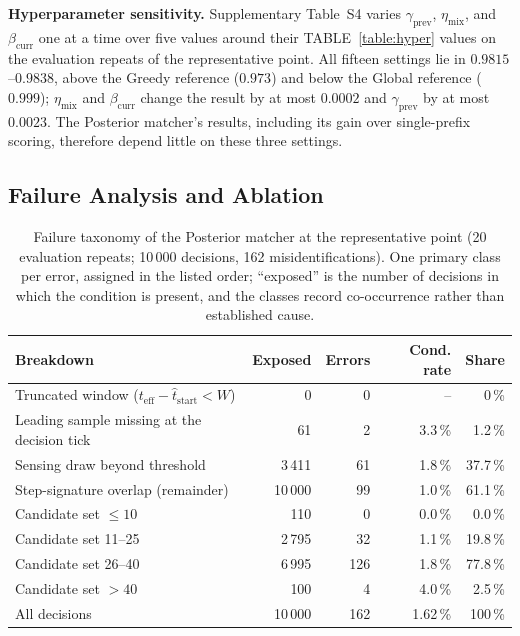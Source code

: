 \documentclass{ieeeaccess}
\newif\ifhighlight \highlightfalse
\DeclareRobustCommand{\revised}[1]{\ifhighlight{\color{blue}#1}\else{\color{.}#1}\fi}
\begin{document}
    \revised{\textbf{Hyperparameter sensitivity.}
    Supplementary Table~S4 varies $\gamma_{\text{prev}}$, $\eta_{\text{mix}}$, and $\beta_{\text{curr}}$ one at a time over five values around their TABLE~\ref{table:hyper} values on the evaluation repeats of the representative point.
    All fifteen settings lie in $0.9815$--$0.9838$, above the Greedy reference ($0.973$) and below the Global reference ($0.999$); $\eta_{\text{mix}}$ and $\beta_{\text{curr}}$ change the result by at most $0.0002$ and $\gamma_{\text{prev}}$ by at most $0.0023$.
    The Posterior matcher's results, including its gain over single-prefix scoring, therefore depend little on these three settings.}



    \subsection{\revised{Failure Analysis and} Ablation}

    \begin{table}[htbp]
        \caption{\revised{Failure taxonomy of the Posterior matcher at the representative point (20 evaluation repeats; 10\,000 decisions, 162 misidentifications). One primary class per error, assigned in the listed order; ``exposed'' is the number of decisions in which the condition is present, and the classes record co-occurrence rather than established cause.}}
        \label{table:taxonomy}
        \centering
        \scriptsize
        \setlength{\tabcolsep}{3pt}
        \revised{\begin{tabular}{@{}lrrrr@{}}
            \toprule
            \textbf{Breakdown} & \textbf{Exposed} & \textbf{Errors} & \textbf{Cond. rate} & \textbf{Share} \\
            \midrule
            Truncated window ($t_{\text{eff}} - \hat{t}_{\text{start}} < W$) & 0 & 0 & -- & 0\,\% \\
            Leading sample missing at the decision tick & 61 & 2 & 3.3\,\% & 1.2\,\% \\
            Sensing draw beyond threshold & 3\,411 & 61 & 1.8\,\% & 37.7\,\% \\
            Step-signature overlap (remainder) & 10\,000 & 99 & 1.0\,\% & 61.1\,\% \\
            \midrule
            Candidate set $\leq 10$ & 110 & 0 & 0.0\,\% & 0.0\,\% \\
            Candidate set 11--25 & 2\,795 & 32 & 1.1\,\% & 19.8\,\% \\
            Candidate set 26--40 & 6\,995 & 126 & 1.8\,\% & 77.8\,\% \\
            Candidate set $> 40$ & 100 & 4 & 4.0\,\% & 2.5\,\% \\
            \midrule
            All decisions & 10\,000 & 162 & 1.62\,\% & 100\,\% \\
            \bottomrule
        \end{tabular}}
    \end{table}
\end{document}
